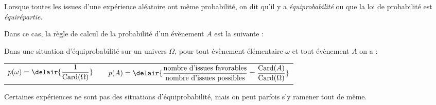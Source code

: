 \begin{definition}
Lorsque toutes les issues d'une exp\'erience al\'eatoire ont même probabilit\'e, on dit qu'il y a \emph{\'equiprobabilit\'e} ou que
la loi de probabilit\'e est \emph{\'equir\'epartie}.
\end{definition}

Dans ce cas, la r\`egle de calcul de la probabilit\'e d'un \'ev\`enement $A$ est la suivante :

\begin{prop}
Dans une situation d'\'equiprobabilit\'e sur un univers $\Omega$, pour tout \'ev\`enement \'el\'ementaire $\omega$ et tout \'ev\`enement $A$ on a :\\
\begin{tabularx}{\linewidth}{lXr}
 $p(\omega) = \delair{\dfrac{1}{\text{Card}(\Omega)}}$ & &
 $p(A) = \delair{\dfrac{\text{nombre d'issues favorables}}{\text{nombre d'issues possibles}}=\dfrac{\text{Card}(A)}{\text{Card}(\Omega)}}$
\end{tabularx}

\end{prop}

Certaines exp\'eriences ne sont pas des situations d'\'equiprobabilit\'e, mais on peut parfois s'y ramener tout de même.

